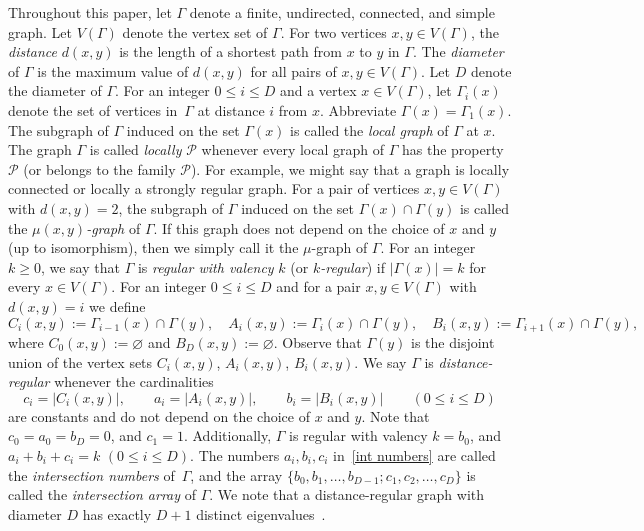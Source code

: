 \documentclass[11pt]{article}
\theoremstyle{definition}
\numberwithin{equation}{section}
\numberwithin{equation}{section}
\begin{document}
Throughout this paper, let $\Gamma$ denote a finite, undirected, connected, and simple graph. 
Let $V(\Gamma)$ denote the vertex set of $\Gamma$.
For two vertices $x,y \in V(\Gamma)$, the \emph{distance} $d(x,y)$ is the length of a shortest path from $x$ to $y$ in $\Gamma$.
The \emph{diameter} of $\Gamma$ is the maximum value of $d(x,y)$ for all pairs of $x,y \in V(\Gamma)$.
Let $D$ denote the diameter of $\Gamma$.
For an integer $0\leqslant i \leqslant D$ and a vertex $x \in V(\Gamma)$, let $\Gamma_i(x)$ denote the set of vertices in~$\Gamma$ at distance $i$ from $x$.
Abbreviate $\Gamma(x)=\Gamma_1(x)$.
The subgraph of $\Gamma$ induced on the set $\Gamma(x)$ is called the \emph{local graph} of $\Gamma$ at $x$.
The graph $\Gamma$ is called \emph{locally} $\mathcal{P}$ whenever every local graph of $\Gamma$ has the property $\mathcal{P}$ (or belongs to the family $\mathcal{P}$).
For example, we might say that a graph is locally connected or locally a strongly regular graph.
For a pair of vertices $x,y \in V(\Gamma)$ with $d(x,y)=2$, the subgraph of $\Gamma$ induced on the set $\Gamma(x)\cap \Gamma(y)$ is called the \emph{$\mu(x,y)$-graph} of $\Gamma$. 
If this graph does not depend on the choice of $x$ and $y$ (up to isomorphism), then we simply call it the $\mu$-graph of $\Gamma$.
For an integer $k\geqslant 0$, we say that $\Gamma$ is \emph{regular with valency} $k$ (or \emph{$k$-regular}) if $|\Gamma(x)|=k$ for every $x\in V(\Gamma)$. 
For an integer $0\leqslant i \leqslant D$ and for a pair $x, y \in V(\Gamma)$ with $d(x,y)=i$ we define 
\begin{equation}\label{sets:CAB}
	C_i(x,y) := \Gamma_{i-1}(x) \cap \Gamma(y), \quad 
	A_i(x,y) := \Gamma_{i}(x) \cap \Gamma(y), \quad 
	B_i(x,y) :=\Gamma_{i+1}(x) \cap \Gamma(y),
\end{equation}
where $C_{0}(x,y):= \varnothing$ and $B_{D}(x,y):=\varnothing$.
Observe that $\Gamma(y)$ is the disjoint union of the vertex sets $C_i(x,y)$, $A_i(x,y)$, $B_i(x,y)$.
We say $\Gamma$ is \emph{distance-regular} whenever the cardinalities 
\begin{equation}\label{int numbers}
	c_i =|C_i(x,y)|, \qquad a_i = |A_i(x,y)|, \qquad b_i=|B_i(x,y)| \qquad (0\leqslant i \leqslant D)
\end{equation}
are constants and do not depend on the choice of $x$ and $y$.
Note that $c_0=a_0=b_D=0$, and $c_1=1$. 
Additionally, $\Gamma$ is regular with valency $k=b_0$, and $a_i+b_i +c_i = k$ $(0\leqslant i \leqslant D)$.
The numbers $a_i, b_i, c_i$ in~\eqref{int numbers} are called the \emph{intersection numbers} of~$\Gamma$, and the array $\{b_0, b_1,\ldots , b_{D-1}; c_1, c_2,\ldots , c_D\}$ is called the {\em intersection array} of  $\Gamma$.
We note that a distance-regular graph with diameter $D$ has exactly $D+1$ distinct eigenvalues~\cite[Proposition 2.6]{DaKoTa}.
\end{document}
